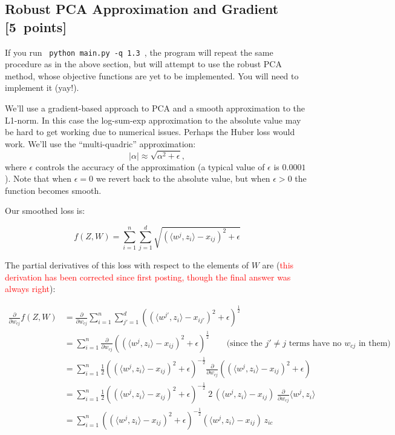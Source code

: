 \documentclass{article}
\newcommand{\red}[1]{\textcolor{red}{#1}}
\let\update\red
\newcommand\pts[1]{\textcolor{pointscolour}{[#1~points]}}
\begin{document}
\subsection{Robust PCA Approximation and Gradient \pts{5}}

If you run \verb| python main.py -q 1.3 |, the program will repeat the same procedure as in the above section, but will attempt to use the robust PCA method, whose objective functions are yet to be implemented. You will need to implement it (yay!).

We'll use a gradient-based approach to PCA and a smooth approximation to the L1-norm. In this case the log-sum-exp approximation to the absolute value may be hard to get working due to numerical issues. Perhaps the Huber loss would work. We'll use the ``multi-quadric'' approximation:
\[
|\alpha| \approx \sqrt{\alpha^2 + \epsilon},
\]
where $\epsilon$ controls the accuracy of the approximation (a typical value of $\epsilon$ is $0.0001$). Note that when $\epsilon=0$ we revert back to the absolute value, but when $\epsilon>0$ the function becomes smooth.

Our smoothed loss is:

\[
f(Z,W) = \sum_{i=1}^n\sum_{j=1}^d \sqrt{(\langle w^j, z_i\rangle - x_{ij})^2 + \epsilon }
\]

The partial derivatives of this loss with respect to the elements of $W$ are
(\update{this derivation has been corrected since first posting, though the final answer was always right}):

\begin{align*}
\frac{\partial}{\partial w_{cj}} f(Z,W)
  &= \frac{\partial}{\partial w_{cj}} \sum_{i=1}^n\sum_{j'=1}^d \left( (\langle w^{j'}, z_i\rangle - x_{ij'})^2 + \epsilon \right)^{\frac12} \\
  &= \sum_{i=1}^n \frac{\partial}{\partial w_{cj}} \left( (\langle w^{j}, z_i\rangle - x_{ij})^2 + \epsilon \right)^{\frac12}  \qquad \text{(since the $j' \ne j$ terms have no $w_{cj}$ in them)} \\
  &= \sum_{i=1}^n \frac12 \left( (\langle w^{j}, z_i\rangle - x_{ij})^2 + \epsilon \right)^{-\frac12} \frac{\partial}{\partial w_{cj}} \left( (\langle w^{j}, z_i\rangle - x_{ij})^2 + \epsilon \right) \\
  &= \sum_{i=1}^n \frac12  \left( (\langle w^{j}, z_i\rangle - x_{ij})^2 + \epsilon \right)^{-\frac12} \;2\,  (\langle w^{j}, z_i\rangle - x_{ij}) \; \frac{\partial}{\partial w_{cj}} \langle w^{j}, z_i\rangle \\
  &= \sum_{i=1}^n \left( (\langle w^{j}, z_i\rangle - x_{ij})^2 + \epsilon \right)^{-\frac12}  (\langle w^j, z_i\rangle - x_{ij}) \, z_{ic}
\end{align*}
\end{document}
